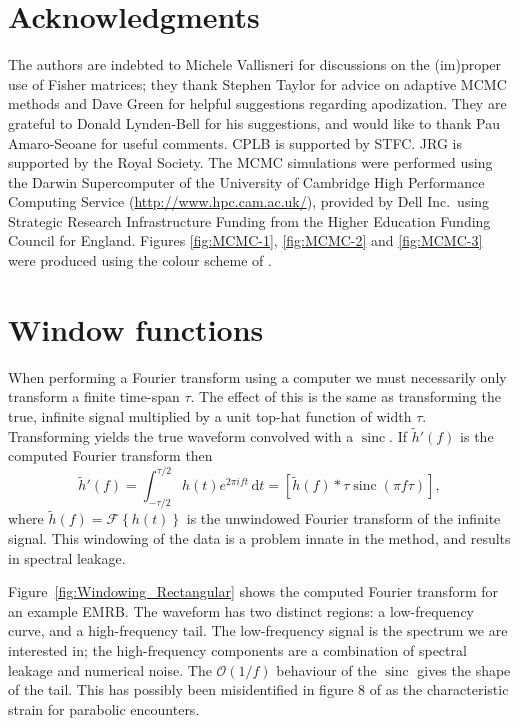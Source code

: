 \documentclass[useAMS,usedcolumn,usegraphicx,usenatbib]{mn2e}
\newcommand{\Figref}[1]{Figure~\ref{fig:#1}}
\DeclareMathOperator{\sinc}{sinc}
\newcommand{\dd}{\ensuremath{\mathrm{d}}}
\newcommand{\intd}[4]{\ensuremath{\int_{#1}^{#2}{#3}\,\dd{#4}}}
\newcommand{\order}[1]{\ensuremath{\mathcal{O}({#1})}}
\begin{document}
\section*{Acknowledgments}

The authors are indebted to Michele Vallisneri for discussions on the (im)proper use of Fisher matrices; they thank Stephen Taylor for advice on adaptive MCMC methods and Dave Green for helpful suggestions regarding apodization. They are grateful to Donald Lynden-Bell for his suggestions, and would like to thank Pau Amaro-Seoane for useful comments. CPLB is supported by STFC. JRG is supported by the Royal Society. The MCMC simulations were performed using the Darwin Supercomputer of the University of Cambridge High Performance Computing Service (\url{http://www.hpc.cam.ac.uk/}), provided by Dell Inc.\ using Strategic Research Infrastructure Funding from the Higher Education Funding Council for England. Figures \ref{fig:MCMC-1}, \ref{fig:MCMC-2} and \ref{fig:MCMC-3} were produced using the colour scheme of \citet{Green2011}.




\appendix

\section{Window functions}\label{ap:window}

When performing a Fourier transform using a computer we must necessarily only transform a finite time-span $\tau$. The effect of this is the same as transforming the true, infinite signal multiplied by a unit top-hat function of width $\tau$. Transforming yields the true waveform convolved with a $\sinc$. If $\tilde{h}'(f)$ is the computed Fourier transform then
\begin{equation}
\tilde{h}'(f) = \intd{-\tau/2}{\tau/2}{h(t)e^{2\pi i ft}}{t} = \left[\tilde{h}(f) \ast \tau \sinc(\pi f\tau)\right],
\end{equation}
where $\tilde{h}(f) = \mathscr{F}\left\{h(t)\right\}$ is the unwindowed Fourier transform of the infinite signal. This windowing of the data is a problem innate in the method, and results in spectral leakage.

\Figref{Windowing_Rectangular} shows the computed Fourier transform for an example EMRB. The waveform has two distinct regions: a low-frequency curve, and a high-frequency tail. The low-frequency signal is the spectrum we are interested in; the high-frequency components are a combination of spectral leakage and numerical noise. The $\order{1/{f}}$ behaviour of the $\sinc$ gives the shape of the tail. This has possibly been misidentified in figure 8 of \citet{Burko2007} as the characteristic strain for parabolic encounters.
\end{document}
